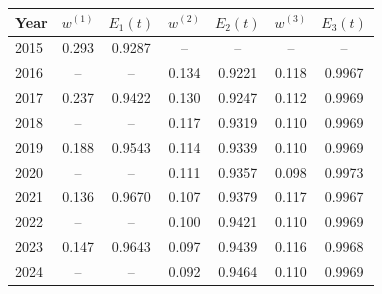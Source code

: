 \begin{tabular}{lcccccc}
\toprule
Year & $w^{(1)}$ & $E_1(t)$ & $w^{(2)}$ & $E_2(t)$ & $w^{(3)}$ & $E_3(t)$ \\
\midrule
2015 & 0.293 & 0.9287 & -- & -- & -- & -- \\
2016 & -- & -- & 0.134 & 0.9221 & 0.118 & 0.9967 \\
2017 & 0.237 & 0.9422 & 0.130 & 0.9247 & 0.112 & 0.9969 \\
2018 & -- & -- & 0.117 & 0.9319 & 0.110 & 0.9969 \\
2019 & 0.188 & 0.9543 & 0.114 & 0.9339 & 0.110 & 0.9969 \\
2020 & -- & -- & 0.111 & 0.9357 & 0.098 & 0.9973 \\
2021 & 0.136 & 0.9670 & 0.107 & 0.9379 & 0.117 & 0.9967 \\
2022 & -- & -- & 0.100 & 0.9421 & 0.110 & 0.9969 \\
2023 & 0.147 & 0.9643 & 0.097 & 0.9439 & 0.116 & 0.9968 \\
2024 & -- & -- & 0.092 & 0.9464 & 0.110 & 0.9969 \\
\bottomrule
\end{tabular}
